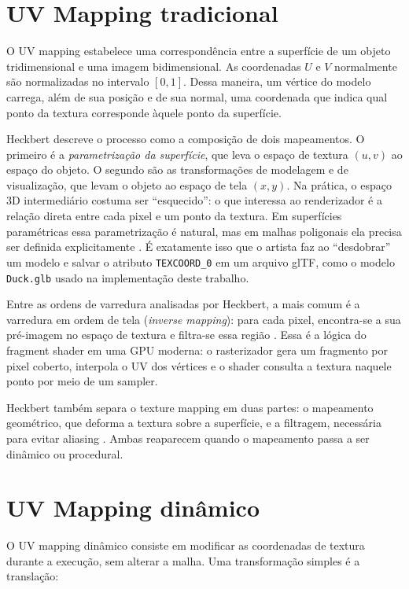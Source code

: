 
\section{UV Mapping tradicional}

O UV mapping estabelece uma correspondência entre a superfície de um objeto tridimensional e uma imagem bidimensional. As coordenadas \(U\) e \(V\) normalmente são normalizadas no intervalo \([0,1]\). Dessa maneira, um vértice do modelo carrega, além de sua posição e de sua normal, uma coordenada que indica qual ponto da textura corresponde àquele ponto da superfície.

Heckbert \cite[p.~2]{heckbert1986} descreve o processo como a composição de dois mapeamentos. O primeiro é a \textit{parametrização da superfície}, que leva o espaço de textura \((u,v)\) ao espaço do objeto. O segundo são as transformações de modelagem e de visualização, que levam o objeto ao espaço de tela \((x,y)\). Na prática, o espaço 3D intermediário costuma ser ``esquecido'': o que interessa ao renderizador é a relação direta entre cada pixel e um ponto da textura. Em superfícies paramétricas essa parametrização é natural, mas em malhas poligonais ela precisa ser definida explicitamente \cite[p.~3]{heckbert1986}. É exatamente isso que o artista faz ao ``desdobrar'' um modelo e salvar o atributo \texttt{TEXCOORD\_0} em um arquivo glTF, como o modelo \texttt{Duck.glb} usado na implementação deste trabalho.

Entre as ordens de varredura analisadas por Heckbert, a mais comum é a varredura em ordem de tela (\textit{inverse mapping}): para cada pixel, encontra-se a sua pré-imagem no espaço de textura e filtra-se essa região \cite[p.~3]{heckbert1986}. Essa é a lógica do fragment shader em uma GPU moderna: o rasterizador gera um fragmento por pixel coberto, interpola o UV dos vértices e o shader consulta a textura naquele ponto por meio de um sampler.

Heckbert também separa o texture mapping em duas partes: o mapeamento geométrico, que deforma a textura sobre a superfície, e a filtragem, necessária para evitar aliasing \cite[p.~1]{heckbert1986}. Ambas reaparecem quando o mapeamento passa a ser dinâmico ou procedural.

\section{UV Mapping dinâmico}

O UV mapping dinâmico consiste em modificar as coordenadas de textura durante a execução, sem alterar a malha. Uma transformação simples é a translação:

